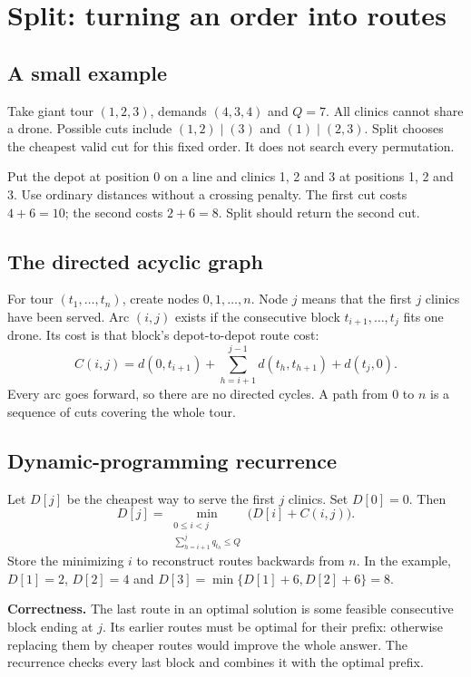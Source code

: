 \section{Split: turning an order into routes}
\subsection*{A small example}
Take giant tour $(1,2,3)$, demands $(4,3,4)$ and $Q=7$. All clinics cannot share a drone.
Possible cuts include $(1,2)\mid(3)$ and $(1)\mid(2,3)$. Split chooses the cheapest valid cut
for this fixed order. It does not search every permutation.

Put the depot at position 0 on a line and clinics 1, 2 and 3 at positions 1, 2 and 3. Use
ordinary distances without a crossing penalty. The first cut costs $4+6=10$; the second costs
$2+6=8$. Split should return the second cut.

\subsection*{The directed acyclic graph}
For tour $(t_1,\ldots,t_n)$, create nodes $0,1,\ldots,n$. Node $j$ means that the first $j$
clinics have been served. Arc $(i,j)$ exists if the consecutive block $t_{i+1},\ldots,t_j$ fits
one drone. Its cost is that block's depot-to-depot route cost:
\[
 C(i,j)=d(0,t_{i+1})+\sum_{h=i+1}^{j-1}d(t_h,t_{h+1})+d(t_j,0).
\]
Every arc goes forward, so there are no directed cycles. A path from 0 to $n$ is a sequence of
cuts covering the whole tour.

\subsection*{Dynamic-programming recurrence}
Let $D[j]$ be the cheapest way to serve the first $j$ clinics. Set $D[0]=0$. Then
\[
 D[j]=\min_{\substack{0\le i<j\\\sum_{h=i+1}^{j}q_{t_h}\le Q}}
       \bigl(D[i]+C(i,j)\bigr).
\]
Store the minimizing $i$ to reconstruct routes backwards from $n$. In the example, $D[1]=2$,
$D[2]=4$ and $D[3]=\min\{D[1]+6,D[2]+6\}=8$.

\textbf{Correctness.} The last route in an optimal solution is some feasible consecutive block
ending at $j$. Its earlier routes must be optimal for their prefix: otherwise replacing them
by cheaper routes would improve the whole answer. The recurrence checks every last block
and combines it with the optimal prefix.

